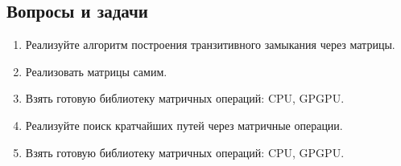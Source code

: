 \subsection{Вопросы и задачи}
\begin{enumerate}
  \item Реализуйте алгоритм построения транзитивного замыкания через матрицы.
  \item Реализовать матрицы самим.
  \item Взять готовую библиотеку матричных операций: CPU, GPGPU.
  \item Реализуйте поиск кратчайших путей через матричные операции.
  \item Взять готовую библиотеку матричных операций: CPU, GPGPU.
\end{enumerate}
